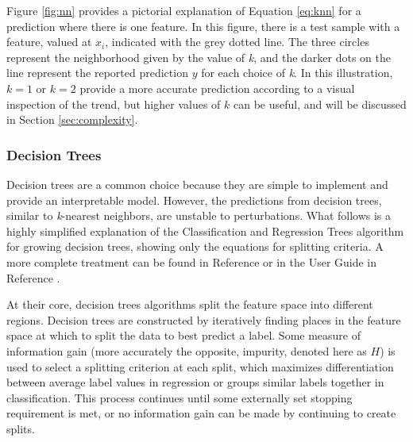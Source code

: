 Figure \ref{fig:nn} provides a pictorial explanation of Equation \ref{eq:knn}
for a prediction where there is one feature. In this figure, there is a test
sample with a feature, valued at $x_i$, indicated with the grey dotted line.
The three circles represent the neighborhood given by the value of \textit{k},
and the darker dots on the line represent the reported prediction $y$ for each
choice of \textit{k}.  In this illustration, $k=1$ or $k=2$ provide a more
accurate prediction according to a visual inspection of the trend, but higher
values of $k$ can be useful, and will be discussed in Section
\ref{sec:complexity}.

\subsubsection{Decision Trees}

Decision trees are a common choice because they are simple to implement and
provide an interpretable model. However, the predictions from decision trees,
similar to \textit{k}-nearest neighbors, are unstable to perturbations.  What
follows is a highly simplified explanation of the Classification and Regression
Trees algorithm for growing decision trees, showing only the equations for
splitting criteria.  A more complete treatment can be found in Reference
\cite{elements_stats} or in the User Guide in Reference \cite{scikit}.

At their core, decision trees algorithms split the feature space into different
regions.  Decision trees are constructed by iteratively finding places in the
feature space at which to split the data to best predict a label. Some measure
of information gain (more accurately the opposite, impurity, denoted here as
$H$) is used to select a splitting criterion at each split, which maximizes
differentiation between average label values in regression or groups similar
labels together in classification.  This process continues until some
externally set stopping requirement is met, or no information gain can be made
by continuing to create splits. 

